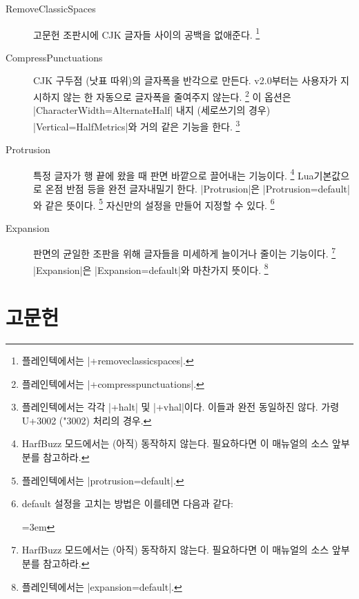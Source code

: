\documentclass[a4paper]{article}
\begin{document}
\begin{description}
\item[RemoveClassicSpaces] %
  고문헌 조판시에 CJK 글자들 사이의 공백을 없애준다.%
  \footnote{%
    플레인텍에서는 |+removeclassicspaces|. }

\item[CompressPunctuations] %
  CJK 구두점 {\small (낫표 따위)}의 글자폭을
  반각으로 만든다. v2.0부터는 사용자가 지시하지 않는 한 자동으로 글자폭을
  줄여주지 않는다.%
  \footnote{%
    플레인텍에서는 |+compresspunctuations|. }
  이 옵션은 |CharacterWidth=AlternateHalf| 내지 {\small (세로쓰기의 경우)}
  |Vertical=HalfMetrics|와 거의 같은 기능을 한다.%
  \footnote{%
    플레인텍에서는 각각 |+halt| 및 |+vhal|이다. 이들과 완전 동일하진
    않다. 가령 U+3002 (\char"3002) 처리의 경우.}

\item[Protrusion] %
  특정 글자가 행 끝에 왔을 때 판면 바깥으로 끌어내는
  기능이다.%
  \footnote{%
    HarfBuzz 모드에서는 (아직) 동작하지 않는다. 필요하다면 이 매뉴얼의
    소스 앞부분를 참고하라.
  }
  Lua 기본값으로 온점 반점 등을 완전 글자내밀기 한다.
  |Protrusion|은 |Protrusion=default|와 같은 뜻이다.%
  \footnote{%
    플레인텍에서는 |protrusion=default|. }
  자신만의 설정을 만들어 지정할 수 있다.%
  \footnote{%
    default 설정을 고치는 방법은 이를테면 다음과 같다:\par
    \leftskip=3em\noindent
     }

\item[Expansion] %
  판면의 균일한 조판을 위해 글자들을 미세하게 늘이거나
  줄이는 기능이다.%
  \footnote{%
    HarfBuzz 모드에서는 (아직) 동작하지 않는다. 필요하다면 이 매뉴얼의
    소스 앞부분를 참고하라.
  }
  |Expansion|은 |Expansion=default|와 마찬가지 뜻이다.%
  \footnote{%
    플레인텍에서는 |expansion=default|. }

\end{description}

\section{고문헌}\label{sec:classic}
\end{document}
